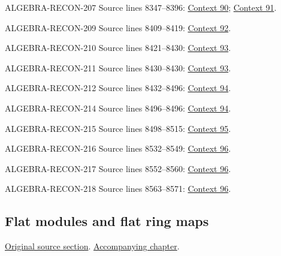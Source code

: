 \begin{AlgebraSourceRoutes}
\item[ALGEBRA-RECON-207] Source lines 8347--8396: \hyperlink{algebra-context-090}{Context 90}; \hyperlink{algebra-context-091}{Context 91}.
\item[ALGEBRA-RECON-209] Source lines 8409--8419: \hyperlink{algebra-context-092}{Context 92}.
\item[ALGEBRA-RECON-210] Source lines 8421--8430: \hyperlink{algebra-context-093}{Context 93}.
\item[ALGEBRA-RECON-211] Source lines 8430--8430: \hyperlink{algebra-context-093}{Context 93}.
\item[ALGEBRA-RECON-212] Source lines 8432--8496: \hyperlink{algebra-context-094}{Context 94}.
\item[ALGEBRA-RECON-214] Source lines 8496--8496: \hyperlink{algebra-context-094}{Context 94}.
\item[ALGEBRA-RECON-215] Source lines 8498--8515: \hyperlink{algebra-context-095}{Context 95}.
\item[ALGEBRA-RECON-216] Source lines 8532--8549: \hyperlink{algebra-context-096}{Context 96}.
\item[ALGEBRA-RECON-217] Source lines 8552--8560: \hyperlink{algebra-context-096}{Context 96}.
\item[ALGEBRA-RECON-218] Source lines 8563--8571: \hyperlink{algebra-context-096}{Context 96}.
\end{AlgebraSourceRoutes}

\subsection{Flat modules and flat ring maps}
\hypertarget{algebra-source-section-flat}{}
\noindent\href{https://github.com/stacks/stacks-project/blob/a04446e57ec1fbc252a871afcec7752fb2807b14/algebra.tex\#L8587}{Original source section}. \href{algebra.pdf\#nameddest=section-flat}{Accompanying chapter}.

